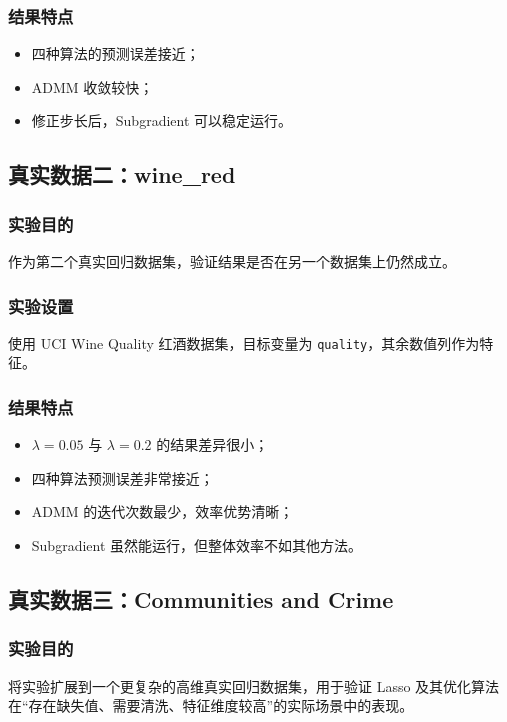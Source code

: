 \documentclass[12pt,a4paper]{ctexart}
\begin{document}
\subsubsection{结果特点}
\begin{itemize}[leftmargin=2em]
    \item 四种算法的预测误差接近；
    \item ADMM 收敛较快；
    \item 修正步长后，Subgradient 可以稳定运行。
\end{itemize}

\subsection{真实数据二：wine\_red}
\subsubsection{实验目的}
作为第二个真实回归数据集，验证结果是否在另一个数据集上仍然成立。

\subsubsection{实验设置}
使用 UCI Wine Quality 红酒数据集，目标变量为 \texttt{quality}，其余数值列作为特征。

\subsubsection{结果特点}
\begin{itemize}[leftmargin=2em]
    \item $\lambda=0.05$ 与 $\lambda=0.2$ 的结果差异很小；
    \item 四种算法预测误差非常接近；
    \item ADMM 的迭代次数最少，效率优势清晰；
    \item Subgradient 虽然能运行，但整体效率不如其他方法。
\end{itemize}

\subsection{真实数据三：Communities and Crime}
\subsubsection{实验目的}
将实验扩展到一个更复杂的高维真实回归数据集，用于验证 Lasso 及其优化算法在“存在缺失值、需要清洗、特征维度较高”的实际场景中的表现。
\end{document}
